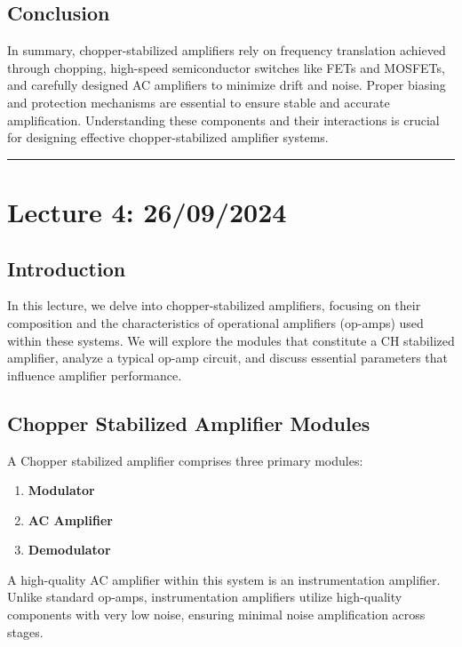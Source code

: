 \documentclass[a4paper,9pt,twoside,openany,twocolumn]{memoir}
\begin{document}
\subsection{Conclusion}
In summary, chopper-stabilized amplifiers rely on frequency translation achieved through chopping, high-speed semiconductor switches like FETs and MOSFETs, and carefully designed AC amplifiers to minimize drift and noise. Proper biasing and protection mechanisms are essential to ensure stable and accurate amplification. Understanding these components and their interactions is crucial for designing effective chopper-stabilized amplifier systems.

\begin{center}\rule{0.5\linewidth}{0.5pt}\end{center}


\section*{Lecture 4: 26/09/2024}

\subsection{Introduction}

In this lecture, we delve into chopper-stabilized amplifiers, focusing on their composition and the characteristics of operational amplifiers (op-amps) used within these systems. We will explore the modules that constitute a CH stabilized amplifier, analyze a typical op-amp circuit, and discuss essential parameters that influence amplifier performance.

\subsection{Chopper Stabilized Amplifier Modules}

A Chopper stabilized amplifier comprises three primary modules:

\begin{enumerate}
    \item \textbf{Modulator}
    \item \textbf{AC Amplifier}
    \item \textbf{Demodulator}
\end{enumerate}

A high-quality AC amplifier within this system is an instrumentation amplifier. Unlike standard op-amps, instrumentation amplifiers utilize high-quality components with very low noise, ensuring minimal noise amplification across stages.
\end{document}
